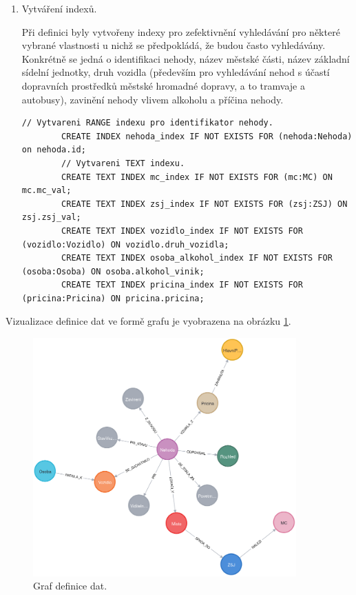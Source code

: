 \documentclass[a4paper, 11pt]{article}
\begin{document}
\begin{enumerate}
    \item Vytváření indexů.

    Při definici byly vytvořeny indexy pro zefektivnění vyhledávání pro některé vybrané vlastnosti u nichž se předpokládá, že budou často vyhledávány. Konkrétně se jedná o identifikaci nehody, název městské části, název základní sídelní jednotky, druh vozidla (především pro vyhledávání nehod s účastí dopravních prostředků městské hromadné dopravy, a to tramvaje a autobusy), zavinění nehody vlivem alkoholu a příčina nehody.

    \begin{lstlisting}[style=Cypher]
        // Vytvareni RANGE indexu pro identifikator nehody.
        CREATE INDEX nehoda_index IF NOT EXISTS FOR (nehoda:Nehoda) on nehoda.id;
        // Vytvareni TEXT indexu.
        CREATE TEXT INDEX mc_index IF NOT EXISTS FOR (mc:MC) ON mc.mc_val;
        CREATE TEXT INDEX zsj_index IF NOT EXISTS FOR (zsj:ZSJ) ON zsj.zsj_val;
        CREATE TEXT INDEX vozidlo_index IF NOT EXISTS FOR (vozidlo:Vozidlo) ON vozidlo.druh_vozidla;
        CREATE TEXT INDEX osoba_alkohol_index IF NOT EXISTS FOR (osoba:Osoba) ON osoba.alkohol_vinik;
        CREATE TEXT INDEX pricina_index IF NOT EXISTS FOR (pricina:Pricina) ON pricina.pricina;
    \end{lstlisting}

    \end{enumerate}

    Vizualizace definice dat ve formě grafu je vyobrazena na obrázku \ref{data_graph}.

    \begin{figure}[ht!]
        \centering                
        \includegraphics[width=0.9\textwidth]{img/graph_data.png}
        \caption{Graf definice dat.\label{data_graph}}
    \end{figure}
\end{document}

